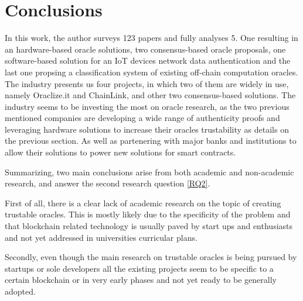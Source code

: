 \documentclass[final,3p,12pt,twocolumn]{elsarticle}
\begin{document}
\section{Conclusions}\label{sec:6}

In this work, the author surveys 123 papers and fully analyses 5. One resulting in an hardware-based oracle solutions, two consensus-based oracle proposals, one software-based solution for an IoT devices network data authentication and the last one propsing a classification system of existing off-chain computation oracles. The industry presents us four projects, in which two of them are widely in use, namely Oraclize.it and ChainLink, and other two consensus-based solutions. The industry seems to be investing the most on oracle research, as the two previous mentioned companies are developing a wide range of authenticity proofs and leveraging hardware solutions to increase their oracles trustability as details on the previous section. As well as partenering with major banks and institutions to allow their solutions to power new solutions for smart contracts.

Summarizing, two main conclusions arise from both academic and non-academic research, and answer the second research question \ref{RQ2}.

First of all, there is a clear lack of academic research on the topic of creating trustable oracles. This is mostly likely due to the specificity of the problem and that blockchain related technology is usually paved by start ups and enthusiasts and not yet addressed in universities curricular plans.

Secondly, even though the main research on trustable oracles is being pursued by startups or sole developers all the existing projects seem to be specific to a certain blockchain or in very early phases and not yet ready to be generally adopted.

\nolinenumbers


\end{document}
